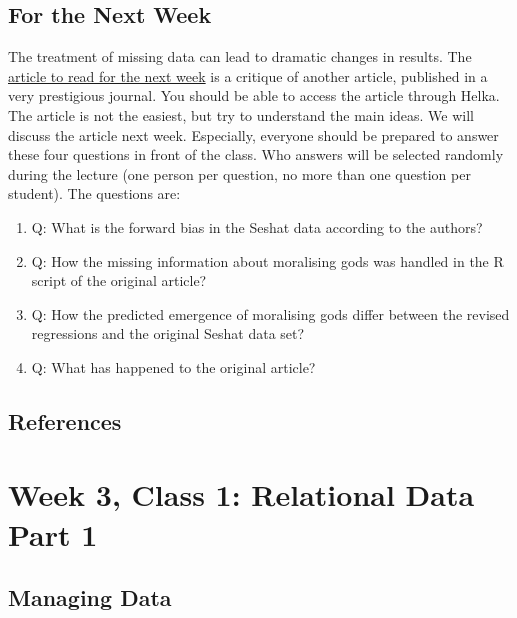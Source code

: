 \documentclass[
]{book}
\providecommand{\tightlist}{%
  \setlength{\itemsep}{0pt}\setlength{\parskip}{0pt}}
\begin{document}
\hypertarget{for-the-next-week}{%
\section{For the Next Week}\label{for-the-next-week}}

The treatment of missing data can lead to dramatic changes in results. The \href{https://www.nature.com/articles/s41586-021-03655-4}{article to read for the next week} is a critique of another article, published in a very prestigious journal.
You should be able to access the article through Helka. The article is not the easiest, but try to understand the main ideas. We will discuss the article next week. Especially, everyone should be prepared to answer these four questions in front of the class. Who answers will be selected randomly during the lecture (one person per question, no more than one question per student). The questions are:

\begin{enumerate}
\def\labelenumi{\arabic{enumi})}
\tightlist
\item
  Q: What is the forward bias in the Seshat data according to the authors?
\item
  Q: How the missing information about moralising gods was handled in the R script of the original article?
\item
  Q: How the predicted emergence of moralising gods differ between the revised regressions and the original Seshat data set?
\item
  Q: What has happened to the original article?
\end{enumerate}

\hypertarget{references-1}{%
\section{References}\label{references-1}}

\hypertarget{week-3-class-1-relational-data-part-1}{%
\chapter{Week 3, Class 1: Relational Data Part 1}\label{week-3-class-1-relational-data-part-1}}

\hypertarget{managing-data}{%
\section{Managing Data}\label{managing-data}}
\end{document}
